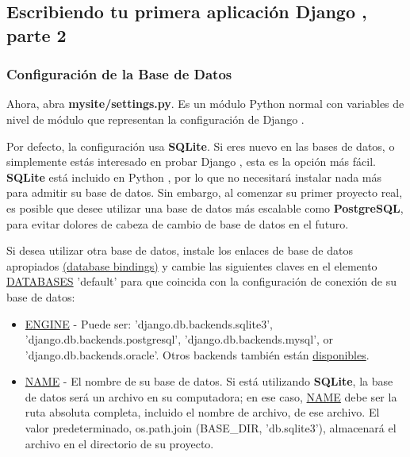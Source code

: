 \documentclass[10pt]{article}
\newcommand{\py}[1]{{\textcolor{B}{Python} #1}}
\newcommand{\django}[1]{{\textcolor{G}{Django} #1}}
\begin{document}
\subsection{Escribiendo tu primera aplicación \django{}, parte 2}
\subsubsection{Configuración de la Base de Datos}
Ahora, abra \textbf{mysite/settings.py}. Es un módulo \py{} normal con variables de nivel de módulo que representan la configuración de \django{}.

Por defecto, la configuración usa \textbf{SQLite}. Si eres nuevo en las bases de datos, o simplemente estás interesado en probar \django{}, esta es la opción más fácil. \textbf{SQLite} está incluido en \py{}, por lo que no necesitará instalar nada más para admitir su base de datos. Sin embargo, al comenzar su primer proyecto real, es posible que desee utilizar una base de datos más escalable como \textbf{PostgreSQL}, para evitar dolores de cabeza de cambio de base de datos en el futuro.

Si desea utilizar otra base de datos, instale los enlaces de base de datos apropiados {\textcolor{B}{\href{https://docs.djangoproject.com/en/3.0/topics/install/\#database-installation}{(database bindings)}}}
 y cambie las siguientes claves en el elemento {\textcolor{B}{\href{https://docs.djangoproject.com/en/3.0/ref/settings/\#std:setting-DATABASES}{DATABASES}}} 'default' para que coincida con la configuración de conexión de su base de datos:

\begin{itemize}
\item \textcolor {B}{\href{https://docs.djangoproject.com/en/3.0/ref/settings/\#std:setting-DATABASE-ENGINE}{ENGINE}} - Puede ser: \textcolor{G}{'django.db.backends.sqlite3'}, \textcolor{G}{'django.db.backends.postgresql'}, \textcolor{G}{'django.db.backends.mysql'}, or \textcolor{G}{'django.db.backends.oracle'}. 
Otros backends también están 
\textcolor {B}{\href{https://docs.djangoproject.com/en/3.0/ref/databases/\#third-party-notes}{disponibles}}.

\item \textcolor {B}{\href{https://docs.djangoproject.com/en/3.0/ref/settings/\#std:setting-NAME}{NAME}} - 
El nombre de su base de datos. Si está utilizando \textbf{SQLite}, la base de datos será un archivo en su computadora; en ese caso, \textcolor {B}{\href{https://docs.djangoproject.com/en/3.0/ref/settings/\#std:setting-NAME}{NAME}} debe ser la ruta absoluta completa, incluido el nombre de archivo, de ese archivo. El valor predeterminado, \textcolor{G}{os.path.join (BASE\_DIR, 'db.sqlite3')}, almacenará el archivo en el directorio de su proyecto.

\end{itemize}
\end{document}

